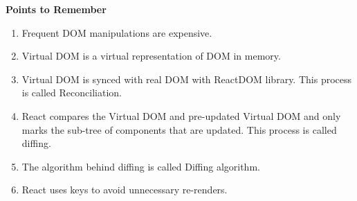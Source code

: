\documentclass{article}
\begin{document}
\noindent \textbf{Points to Remember}

\begin{enumerate}
\item \textbf{ }Frequent DOM manipulations are expensive.

\item  Virtual DOM is a virtual representation of DOM in memory.

\item  Virtual DOM is synced with real DOM with ReactDOM library. This process is called Reconciliation.

\item  React compares the Virtual DOM and pre-updated Virtual DOM and only marks the sub-tree of components that are updated. This process is called diffing.

\item  The algorithm behind diffing is called Diffing algorithm.

\item  React uses keys to avoid unnecessary re-renders.
\end{enumerate}
\end{document}
